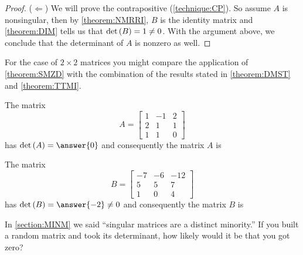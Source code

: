 \documentclass{ximera}
\begin{document}
\begin{theorem}
\begin{proof}
    ($\Leftarrow$) We will prove the contrapositive
    (\ref{technique:CP}).  So assume $A$ is nonsingular, then by
    \ref{theorem:NMRRI}, $B$ is the identity matrix and
    \ref{theorem:DIM} tells us that $\det\left(B\right)=1\neq 0$.  With the
    argument above, we conclude that the determinant of $A$ is nonzero
    as well.
  \end{proof}
\end{theorem}

For the case of $2\times 2$ matrices you might compare the application
of \ref{theorem:SMZD} with the combination of the results stated in
\ref{theorem:DMST} and \ref{theorem:TTMI}.

\begin{example}
  The matrix
  \[
    A = \begin{bmatrix}
      1 & -1 & 2\\
      2 & 1 & 1\\
      1 & 1 & 0
    \end{bmatrix}
  \]
  has $\detname{A} = \answer{0}$ and consequently the matrix $A$ is
  \begin{multipleChoice}
  \end{multipleChoice}
\end{example}

\begin{example}
  The matrix
  \[
    B = \begin{bmatrix}
      -7&-6&-12\\
      5&5&7\\
      1&0&4
    \end{bmatrix}
  \]
  has $\detname{B} = \answer{-2} \neq 0$ and consequently the matrix $B$ is
  \begin{multipleChoice}
  \end{multipleChoice}
\end{example}

\begin{question}
  In \ref{section:MINM} we said ``singular matrices are a distinct
  minority.''  If you built a random matrix and took its determinant,
  how likely would it be that you got zero?

  \begin{multipleChoice}
  \end{multipleChoice}
\end{question}
\end{document}
